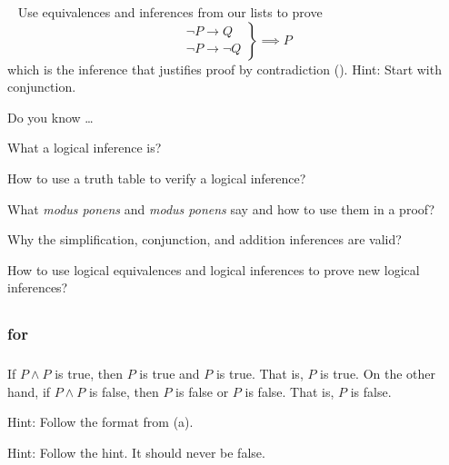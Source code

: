 \begin{exer}[\exerU] %
\label{exer_proof_infer_contradiction}
~
    Use equivalences and inferences from our lists to prove
            $$\left. \begin{array} {cc} \neg P \to Q \\ \neg P \to \neg Q \end{array} \right\} \implies P$$  
        which is the inference that justifies proof by contradiction (). Hint: Start with conjunction.
\end{exer}

\begin{exer}[\exerR] %
\label{exer_dyk_logical_inference}
    Do you know \ldots
        \begin{exerpart}
            \item What a logical inference is?
            \item How to use a truth table to verify a logical inference?
            \item What \emph{modus ponens} and \emph{modus ponens} say and how to use them in a proof?
            \item Why the simplification, conjunction, and addition inferences are valid?
            \item How to use logical equivalences and logical inferences to prove new logical inferences?
        \end{exerpart}
\end{exer}

\subsection{\answers}

\subsubsection{\answers for  \subequiv}

\subsubsection*{ \answers}
\begin{apart}
    \item If $P \land P$ is true, then $P$ is true and $P$ is true. That is, $P$ is true.  On the other hand, if $P \land P$ is false, then $P$ is false or $P$ is false.  That is, $P$ is false.
    \item Hint: Follow the format from (a).
    \item Hint: Follow the hint.  It should never be false. 
\end{apart}

